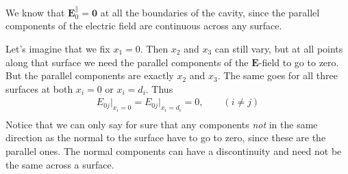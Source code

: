We know that \(\mathbf{E}_0^{\parallel} = \mathbf{0}\) at all the boundaries of the cavity, since the parallel components of the electric field are continuous across any surface. 

Let's imagine that we fix \(x_1 = 0\). Then \(x_2\) and \(x_3\) can still vary, but at all points along that surface we need the parallel components of the \(\mathbf{E}\)-field to go to zero. But the parallel components are exactly \(x_2\) and \(x_3\). The same goes for all three surfaces at both \(x_i = 0\) or \(x_i = d_i\). Thus \begin{align*}
    E_{0j}\bigr|_{x_i = 0} = E_{0j}\bigr|_{x_i = d_i} = 0, \qquad (i \neq j)\\
\end{align*}
Notice that we can only say for sure that any components \textit{not} in the same direction as the normal to the surface have to go to zero, since these are the parallel ones. The normal components can have a discontinuity and need not be the same across a surface.

